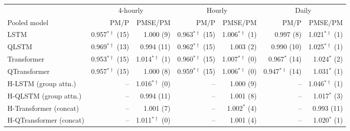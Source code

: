 \begin{tabular}{lrrrrrr}
\toprule
 & \multicolumn{2}{c}{4-hourly} & \multicolumn{2}{c}{Hourly} & \multicolumn{2}{c}{Daily} \\
\cmidrule(lr){2-3}\cmidrule(lr){4-5}\cmidrule(lr){6-7}
Pooled model & PM/P & PMSE/PM & PM/P & PMSE/PM & PM/P & PMSE/PM \\
\midrule
LSTM & 0.957$^{*\dagger}$ (15) & 1.000 (9) & 0.963$^{*\dagger}$ (15) & 1.006$^{*\dagger}$ (1) & 0.997 (8) & 1.021$^{*\dagger}$ (1) \\
QLSTM & 0.969$^{*\dagger}$ (13) & 0.994 (11) & 0.962$^{*\dagger}$ (15) & 1.003 (2) & 0.990 (10) & 1.025$^{*\dagger}$ (1) \\
Transformer & 0.953$^{*\dagger}$ (15) & 1.014$^{*\dagger}$ (1) & 0.960$^{*\dagger}$ (15) & 1.007$^{*\dagger}$ (0) & 0.967$^{*}$ (14) & 1.024$^{*}$ (2) \\
QTransformer & 0.957$^{*\dagger}$ (15) & 1.000 (8) & 0.959$^{*\dagger}$ (15) & 1.006$^{*\dagger}$ (0) & 0.947$^{*\dagger}$ (14) & 1.031$^{*}$ (1) \\
H-LSTM (group attn.) & -- & 1.016$^{*\dagger}$ (0) & -- & 1.000 (9) & -- & 1.046$^{*\dagger}$ (1) \\
H-QLSTM (group attn.) & -- & 0.994 (11) & -- & 1.001 (8) & -- & 1.017$^{*}$ (3) \\
H-Transformer (concat) & -- & 1.001 (7) & -- & 1.002$^{*}$ (4) & -- & 0.993 (11) \\
H-QTransformer (concat) & -- & 1.011$^{*\dagger}$ (0) & -- & 1.001 (4) & -- & 1.020$^{*}$ (1) \\
\bottomrule
\end{tabular}
